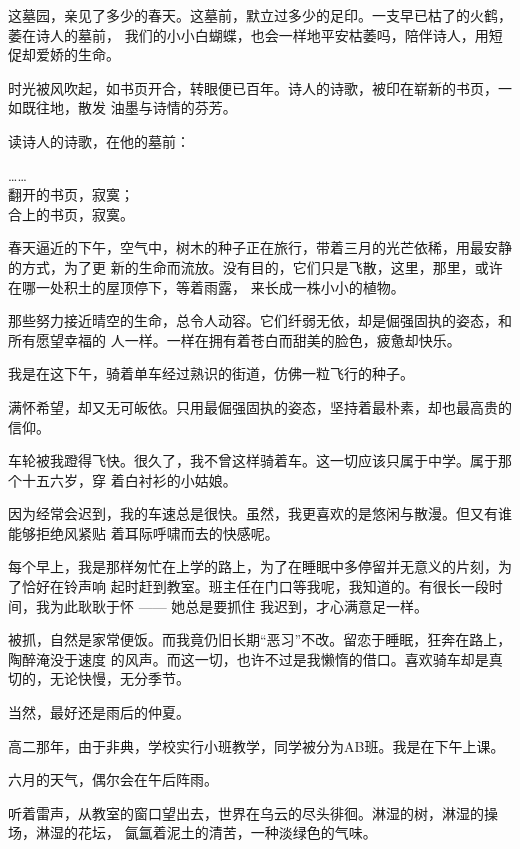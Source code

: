 		这墓园，亲见了多少的春天。这墓前，默立过多少的足印。一支早已枯了的火鹤，萎在诗人的墓前，
	我们的小小白蝴蝶，也会一样地平安枯萎吗，陪伴诗人，用短促却爱娇的生命。


		时光被风吹起，如书页开合，转眼便已百年。诗人的诗歌，被印在崭新的书页，一如既往地，散发
	油墨与诗情的芬芳。

		读诗人的诗歌，在他的墓前：

		\longpoem{}{}{}
			…… \\
			翻开的书页，寂寞；\\
			合上的书页，寂寞。
		\endlongpoem

	\endwriting



		春天逼近的下午，空气中，树木的种子正在旅行，带着三月的光芒依稀，用最安静的方式，为了更
	新的生命而流放。没有目的，它们只是飞散，这里，那里，或许在哪一处积土的屋顶停下，等着雨露，
	来长成一株小小的植物。

		那些努力接近晴空的生命，总令人动容。它们纤弱无依，却是倔强固执的姿态，和所有愿望幸福的
	人一样。一样在拥有着苍白而甜美的脸色，疲惫却快乐。


		我是在这下午，骑着单车经过熟识的街道，仿佛一粒飞行的种子。

		满怀希望，却又无可皈依。只用最倔强固执的姿态，坚持着最朴素，却也最高贵的信仰。


		车轮被我蹬得飞快。很久了，我不曾这样骑着车。这一切应该只属于中学。属于那个十五六岁，穿
	着白衬衫的小姑娘。

		因为经常会迟到，我的车速总是很快。虽然，我更喜欢的是悠闲与散漫。但又有谁能够拒绝风紧贴
	着耳际呼啸而去的快感呢。

		每个早上，我是那样匆忙在上学的路上，为了在睡眠中多停留并无意义的片刻，为了恰好在铃声响
	起时赶到教室。班主任在门口等我呢，我知道的。有很长一段时间，我为此耿耿于怀 —— 她总是要抓住
	我迟到，才心满意足一样。

		被抓，自然是家常便饭。而我竟仍旧长期“恶习”不改。留恋于睡眠，狂奔在路上，陶醉淹没于速度
	的风声。而这一切，也许不过是我懒惰的借口。喜欢骑车却是真切的，无论快慢，无分季节。


		当然，最好还是雨后的仲夏。


		高二那年，由于非典，学校实行小班教学，同学被分为AB班。我是在下午上课。

		六月的天气，偶尔会在午后阵雨。

		听着雷声，从教室的窗口望出去，世界在乌云的尽头徘徊。淋湿的树，淋湿的操场，淋湿的花坛，
	氤氲着泥土的清苦，一种淡绿色的气味。

